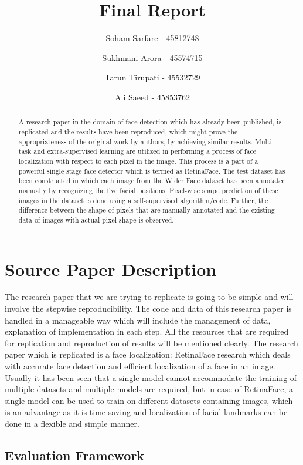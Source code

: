 \documentclass{article}
\title{Final Report}
\author{Soham Sarfare - 45812748 \and Sukhmani Arora - 45574715 \and Tarun Tirupati - 45532729 \and Ali Saeed - 45853762}
\begin{document}
\maketitle

\tableofcontents

\pagebreak
\begin{abstract}

A research paper in the domain of face detection which has already been published, is replicated and the results have been reproduced, which might prove the appropriateness of the original work by authors, by achieving similar results. Multi-task and extra-supervised learning are utilized in performing a process of face localization with respect to each pixel in the image. This process is a part of a powerful single stage face detector which is termed as RetinaFace. The test dataset has been constructed in which each image from the Wider Face dataset has been annotated manually by recognizing the five facial positions. Pixel-wise shape prediction of these images in the dataset is done using a self-supervised algorithm/code. Further, the difference between the shape of pixels that are manually annotated and the existing data of images with actual pixel shape is observed.
\end{abstract}
\section{Source Paper Description}

The research paper that we are trying to replicate is going to be simple and will involve the stepwise reproducibility. The code and data of this research paper is handled in a manageable way which will include the management of data, explanation of implementation in each step. All the resources that are required for replication and reproduction of results will be mentioned clearly.
The research paper which is replicated is a face localization: RetinaFace research which deals with accurate face detection and efficient localization of a face in an image. Usually it has been seen that a single model cannot accommodate the training of multiple datasets and multiple models are required, but in case of RetinaFace, a single model can be used to train on different datasets containing images, which is an advantage as it is time-saving and localization of facial landmarks can be done in a flexible and simple manner.
\subsection{Evaluation Framework}
\end{document}

